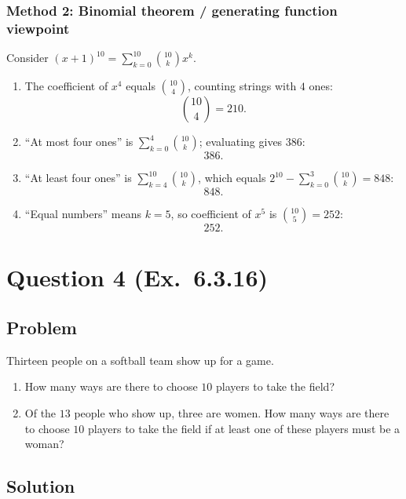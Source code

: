 \documentclass[12pt]{article}
\begin{document}
\subsubsection{Method 2: Binomial theorem / generating function viewpoint}
Consider $(x+1)^{10}=\sum_{k=0}^{10}\binom{10}{k}x^k$.

\begin{enumerate}[label=(\alph*)]
\item The coefficient of $x^4$ equals $\binom{10}{4}$, counting strings with $4$ ones:
\[
\boxed{\binom{10}{4}=210}.
\]

\item ``At most four ones'' is $\sum_{k=0}^{4}\binom{10}{k}$; evaluating gives $386$:
\[
\boxed{386}.
\]

\item ``At least four ones'' is $\sum_{k=4}^{10}\binom{10}{k}$, which equals $2^{10}-\sum_{k=0}^{3}\binom{10}{k}=848$:
\[
\boxed{848}.
\]

\item ``Equal numbers'' means $k=5$, so coefficient of $x^5$ is $\binom{10}{5}=252$:
\[
\boxed{252}.
\]
\end{enumerate}

\newpage

\section{Question 4 (Ex.\ 6.3.16)}
\subsection{Problem}
Thirteen people on a softball team show up for a game.
\begin{enumerate}[label=(\alph*)]
\item How many ways are there to choose $10$ players to take the field?
\item Of the $13$ people who show up, three are women. How many ways are there to choose $10$ players to take the field if at least one of these players must be a woman?
\end{enumerate}

\subsection{Solution}
\end{document}
